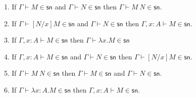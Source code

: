 \documentclass{article}
\newcommand{\csn}{\mathsf{sn}}
\newcommand{\red}{\longrightarrow}
\begin{document}
\begin{lemma}\label{lem:psn}$\;$
  \begin{enumerate}
  \item\label{pp2} If $\Gamma \vdash M \in \csn$ and $\Gamma \vdash N \in \csn$
    then $\Gamma \vdash M~N \in \csn$.
  \item\label{pp3} If $\Gamma \vdash [N/x]M \in \csn$ and $\Gamma \vdash N \in
    \csn$ then $\Gamma, x{:}A \vdash M \in \csn$.
  \item\label{pp4} If $\Gamma, x{:}A \vdash M \in \csn$ then $\Gamma \vdash  \lambda x.M \in \csn$
  \item\label{pp5} If $\Gamma, x{:}A \vdash M \in \csn$ and $\Gamma \vdash N \in
   \csn$ then $\Gamma \vdash [N/x]M \in \csn$.  
  \item\label{pp6} If $\Gamma \vdash M~N \in \csn$ then $\Gamma \vdash M \in \csn$ and $\Gamma \vdash N \in \csn$.
  \item\label{pp7} If $\Gamma \vdash \lambda x{:}A.M \in \csn$ 
    then $\Gamma, x{:}A \vdash M \in \csn$.

  \end{enumerate} 
\end{lemma}
\end{document}
